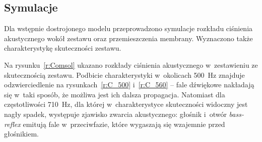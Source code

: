 \documentclass[12pt]{oska}
\begin{document}
	\subsection{Symulacje}
		
		Dla wstępnie dostrojonego modelu przeprowadzono symulacje rozkładu ciśnienia akustycznego wokół zestawu oraz przemieszczenia membrany. Wyznaczono także charakterystykę skuteczności zestawu. 
		
		Na rysunku~\ref{r:Comsol} ukazano rozkłady ciśnienia akustycznego w~zestawieniu ze skutecznością zestawu. Podbicie charakterystyki w~okolicach \SI{500}{\hertz} znajduje odzwierciedlenie na rysunkach~\ref{r:C_500} i~\ref{r:C_560} -- fale dźwiękowe nakładają się w~taki sposób, że możliwa jest ich dalsza propagacja. Natomiast dla częstotliwości \SI{710}{\hertz}, dla której w~charakterystyce skuteczności widoczny jest nagły spadek, występuje zjawisko zwarcia akustycznego: głośnik i~otwór \textit{bass-reflex} emitują fale w~przeciwfazie, które wygaszają się wzajemnie przed głośnikiem.
		
\end{document}
